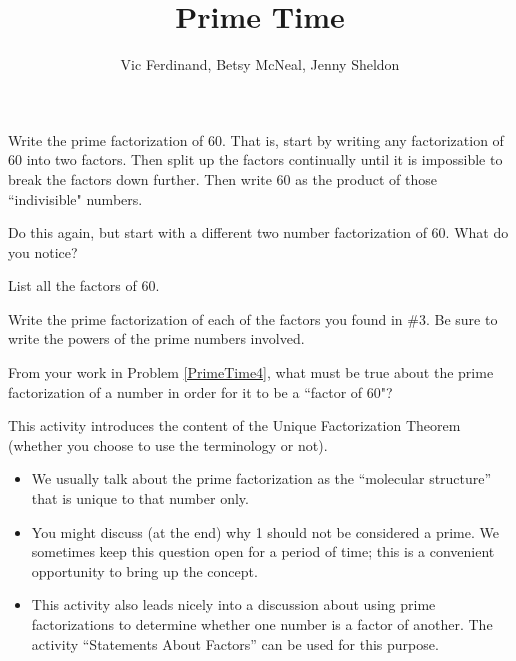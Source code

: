 \documentclass[nooutcomes]{ximera}
\title{Prime Time}
\author{Vic Ferdinand, Betsy McNeal, Jenny Sheldon}
\begin{document}
\begin{abstract} \end{abstract}
\maketitle



\begin{problem}
 Write the prime factorization of 60.  That is, start by writing any factorization of 60 into two factors.  Then split up the factors continually until it is impossible to break the factors down further.  Then write 60 as the product of those ``indivisible" numbers.
\end{problem} 
\begin{problem}
 Do this again, but start with a different two number factorization of 60.  What do you notice?
\end{problem} 
\begin{problem}
 List all the factors of 60.
\end{problem} 
\begin{problem}\label{PrimeTime4}
 Write the prime factorization of each of the factors you found in $\#$3.  Be sure to write the powers of the prime numbers involved.
\end{problem} 
\begin{problem}
 From your work in Problem \ref{PrimeTime4}, what must be true about the prime factorization of a number in order for it to be a ``factor of 60"? 
\end{problem} 


\newpage
\begin{instructorNotes}
This activity introduces the content of the Unique Factorization Theorem (whether you choose to use the terminology or not). 

\begin{itemize}
	\item We usually talk about the prime factorization as the ``molecular structure'' that is unique to that number only.
	\item You might discuss (at the end) why 1 should not be considered a prime.  We sometimes keep this question open for a period of time; this is a convenient opportunity to bring up the concept.
	\item This activity also leads nicely into a discussion about using prime factorizations to determine whether one number is a factor of another. The activity ``Statements About Factors'' can be used for this purpose.
\end{itemize}

\end{instructorNotes}
\end{document}

